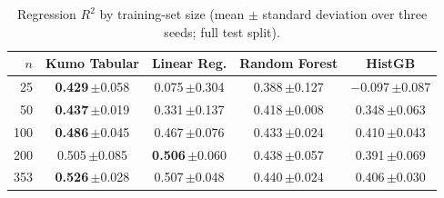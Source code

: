 \begin{table}[t]
\centering
\caption{Regression $R^2$ by training-set size (mean $\pm$ standard deviation over three seeds; full test split).}
\label{tab:study_regression}
\setlength{\tabcolsep}{3pt}
\begin{tabular}{rcccc}
\toprule
$n$ & Kumo Tabular & Linear Reg. & Random Forest & HistGB \\
\midrule
25 & \textbf{0.429}\,{\scriptsize$\pm$0.058} & 0.075\,{\scriptsize$\pm$0.304} & 0.388\,{\scriptsize$\pm$0.127} & $-$0.097\,{\scriptsize$\pm$0.087} \\
50 & \textbf{0.437}\,{\scriptsize$\pm$0.019} & 0.331\,{\scriptsize$\pm$0.137} & 0.418\,{\scriptsize$\pm$0.008} & 0.348\,{\scriptsize$\pm$0.063} \\
100 & \textbf{0.486}\,{\scriptsize$\pm$0.045} & 0.467\,{\scriptsize$\pm$0.076} & 0.433\,{\scriptsize$\pm$0.024} & 0.410\,{\scriptsize$\pm$0.043} \\
200 & 0.505\,{\scriptsize$\pm$0.085} & \textbf{0.506}\,{\scriptsize$\pm$0.060} & 0.438\,{\scriptsize$\pm$0.057} & 0.391\,{\scriptsize$\pm$0.069} \\
353 & \textbf{0.526}\,{\scriptsize$\pm$0.028} & 0.507\,{\scriptsize$\pm$0.048} & 0.440\,{\scriptsize$\pm$0.024} & 0.406\,{\scriptsize$\pm$0.030} \\
\bottomrule
\end{tabular}
\end{table}
